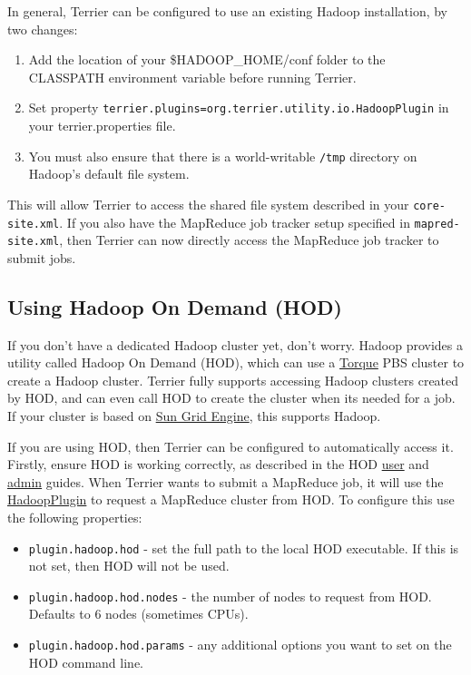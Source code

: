 In general, Terrier can be configured to use an existing Hadoop
installation, by two changes:

\begin{enumerate}
\tightlist
\item
  Add the location of your \$HADOOP\_HOME/conf folder to the CLASSPATH
  environment variable before running Terrier.
\item
  Set property
  \texttt{terrier.plugins=org.terrier.utility.io.HadoopPlugin} in your
  terrier.properties file.
\item
  You must also ensure that there is a world-writable \texttt{/tmp}
  directory on Hadoop's default file system.
\end{enumerate}

This will allow Terrier to access the shared file system described in
your \texttt{core-site.xml}. If you also have the MapReduce job tracker
setup specified in \texttt{mapred-site.xml}, then Terrier can now
directly access the MapReduce job tracker to submit jobs.

\subsection{Using Hadoop On Demand
(HOD)}\label{using-hadoop-on-demand-hod}

If you don't have a dedicated Hadoop cluster yet, don't worry. Hadoop
provides a utility called Hadoop On Demand (HOD), which can use a
\href{http://www.adaptivecomputing.com/products/open-source/torque/}{Torque}
PBS cluster to create a Hadoop cluster. Terrier fully supports accessing
Hadoop clusters created by HOD, and can even call HOD to create the
cluster when its needed for a job. If your cluster is based on
\href{http://gridengine.sunsource.net/}{Sun Grid Engine}, this supports
Hadoop.

If you are using HOD, then Terrier can be configured to automatically
access it. Firstly, ensure HOD is working correctly, as described in the
HOD
\href{http://hadoop.apache.org/docs/r0.19.0/hod_user_guide.html}{user}
and
\href{http://hadoop.apache.org/docs/r0.19.0/hod_admin_guide.html}{admin}
guides. When Terrier wants to submit a MapReduce job, it will use the
\href{javadoc/org/terrier/utility/io/HadoopPlugin.html}{HadoopPlugin} to
request a MapReduce cluster from HOD. To configure this use the
following properties:

\begin{itemize}
\tightlist
\item
  \texttt{plugin.hadoop.hod} - set the full path to the local HOD
  executable. If this is not set, then HOD will not be used.
\item
  \texttt{plugin.hadoop.hod.nodes} - the number of nodes to request from
  HOD. Defaults to 6 nodes (sometimes CPUs).
\item
  \texttt{plugin.hadoop.hod.params} - any additional options you want to
  set on the HOD command line.
\end{itemize}

